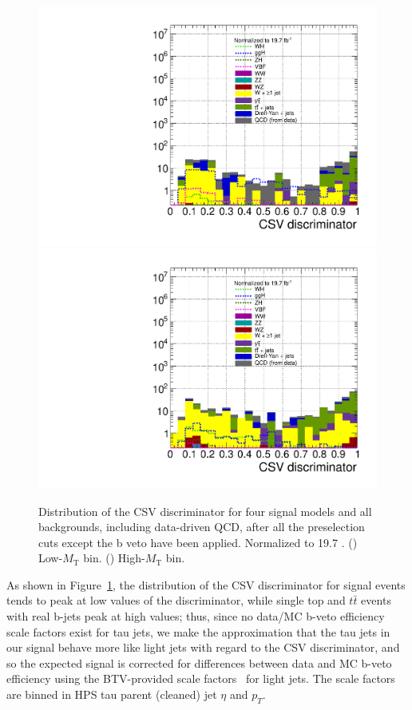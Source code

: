 \begin{figure}[hbtp]
  \begin{center}
    \includegraphics[width=\cmsFigWidth]{figures/sigVsBkg_csv_regA_lowMT_v61}
    \includegraphics[width=\cmsFigWidth]{figures/sigVsBkg_csv_regA_highMT_v61}
    \caption{Distribution of the CSV discriminator for four signal models and all backgrounds, including data-driven QCD, after all the preselection cuts except the b veto have been applied. Normalized to 19.7 \fbinv. (\cmsLeft) Low-$M_{\text{T}}$ bin. (\cmsRight) High-$M_{\text{T}}$ bin.}
    \label{fig:sigVsBkg_csv_regA}
  \end{center}
\end{figure}

As shown in Figure~\ref{fig:sigVsBkg_csv_regA}, the distribution of the CSV discriminator for signal events tends to peak at low values of the discriminator, while single top and $t\bar{t}$ events with real b-jets peak at high values; thus, since no data/MC b-veto efficiency scale factors exist for tau jets, we make the approximation that the tau jets in our signal behave more like light jets with regard to the CSV discriminator, and so the expected signal is corrected for differences between data and MC b-veto efficiency using the BTV-provided scale factors~\cite{CMS:btaguncertaintytwiki} for light jets.  The scale factors are binned in HPS tau parent (cleaned) jet $\eta$ and $p_T$.

